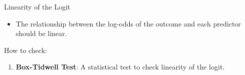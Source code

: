 \documentclass[
  18 pt,
  ignorenonframetext,
  aspectratio=1610,
]{beamer}
\providecommand{\tightlist}{%
  \setlength{\itemsep}{0pt}\setlength{\parskip}{0pt}}\usepackage{longtable,booktabs,array}
\begin{document}
\begin{frame}[fragile]{Linearity of the Logit}
\protect\hypertarget{linearity-of-the-logit}{}
\begin{itemize}
\tightlist
\item
  The relationship between the log-odds of the outcome and each
  predictor should be linear.
\end{itemize}

\begin{block}{How to check:}
\protect\hypertarget{how-to-check-4}{}
\begin{enumerate}
\tightlist
\item
  \textbf{Box-Tidwell Test}: A statistical test to check linearity of
  the logit.
\end{enumerate}

\tiny


\end{block}
\end{frame}
\end{document}
